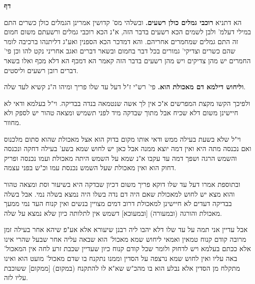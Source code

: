 \documentclass[12pt, openany]{book}
\newcommand{\sethebfont}{
\fontsize{10.5pt}{21.0pt} \selectfont
}
\newcommand{\twocol}[1]{
	{\sethebfont \begin{multicols}{2}
			#1
	\end{multicols}}	
}
\newcommand{\chapname}{}
\newcommand{\newchap}[1]{
	\addcontentsline{toc}{chapter}{#1}
	\renewcommand{\chapname}{#1}
		\begin{center}
			\textbf{%
\fontsize{16pt}{16pt}\selectfont
				#1}
		\end{center}
}
\begin{document}
\newchap{דף }
\twocol{הא דתניא \textbf{רוכבי גמלים כולן רשעים.}  ובשלהי מס' קדושין אמרינן הגמלים כולן כשרים התם במילי דעלמ' ולבן לשמים הכא רשעים בדבר הזה, א"נ הכא רוכבי גמלים ורשעתם משום חמום זה התם גמלים שמחמרים אחריהם. והא דמדכר הכא הספנין ואע"ג דליתנהו ברכיבה לומר שהם כשרים וצדיקי' גמורים בכל דבר בחמום ובשאר דברים ואגב אחריני נקט להו וכן פי' החמרים יש מהן צדיקים ויש מהן רשעים בדבר הזה קאמר הא דמכף הא דלא מכף ואלו בשאר דברים רובן רשעים וליסטים. 
\par\textbf{וליחוש דילמא דם מאכולת הוא.}  פי' רש"י ז"ל דעל עד שלו פריך ומיהו ה"נ קשיא לעד שלה.\par  ולפיכך הקשו מקצת המפרשים א"כ אין לך אשה שנטמאה בנדה בבדיקה. וי"ל בעלמא ודאי לא חיישינן משום דלא שכיח אבל מתוך שבדקה מיד לפני תשמיש ומצאה טהור יש לספק ולא מחוור.\par וי"ל שלא בשעת בעילה ממש ודאי אותו מקום בדוק הוא אצל מאכולת שהוא סתום מלכנוס ואם נכנסה מתה היא ואין דמה יוצא ממנה אבל כאן יש לחוש שמא בשע' בעילה דחקה ונכנסה והשמש הרגה ושפך דמה עד עקבו א"נ שמא על השמש היתה מאכולת ועמו נכנסה ופריק דחוק הוא ואין מאכולת שעל השמש נכנסת עמו וכ"ש בפני עצמה.\par  ובתוספת אמרו דעל עד שלו דוקא פריך משום דכיון שבדקה היא בשיעור וסת ומצאה טהור והוא מצא יש לחוש למאכולת שאם היה דם נדה בשלו היה נמצא בשלה נמי. אבל בשלה בבדיקה דעדים לא חיישינן למאכולת דרוב דמים מצויין בנשים ואין קנוח העד נמי ממעך מאכולת והורגה (ובמעורה) [ובמעוכא] דשמש אין לתלותה כיון שלא נמצא על שלה.\par אבל עדיין אני תמה על עד שלו דלא יהבו ליה רבנן שיעורא אלא אע"פ שיהא אחר בעילה זמן מרובה קודם קנוח טמאין ואמאי ליחוש שמא מאכול' הוא שבאה עליה אחר שבעל שהרי אינו אלא ככתם בעלמא ויש לדחוק ולומר שכל קודם קנוח כיון שעדיין שכבת זרע לחה אין המאכול' באה עליו ואין לחוש שמא נרצפה על הסדין וממנו נתקנח בו שדם מאכול' מועט הוא ואינו מתקלח מן הסדין אלא נבלע הוא בו מהכ"ש שא"א לו להתקנח (במקום) [ממקום] ששוכבת עליו לזה. 
}
\end{document}

